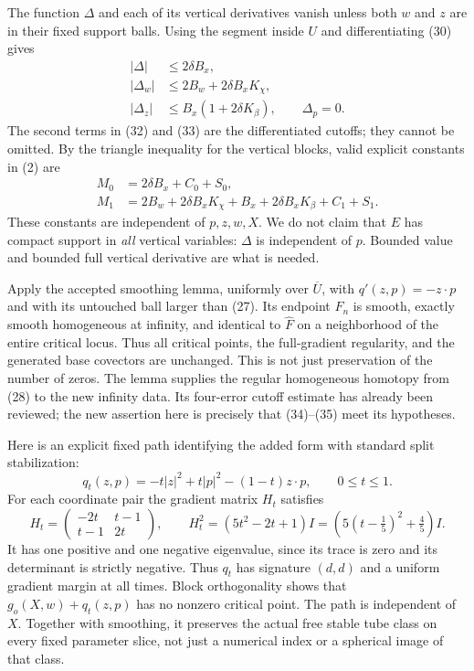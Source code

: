 \documentclass[11pt]{article}
\begin{document}
The function \(\Delta\) and each of its vertical derivatives vanish
unless both \(w\) and \(z\) are in their fixed support balls.
Using the segment inside \(U\) and differentiating (30) gives
\begin{align}
 |\Delta|&\leq2\delta B_x, \tag{31}\\
 |\Delta_w|&\leq2B_w+2\delta B_xK_\chi, \tag{32}\\
 |\Delta_z|&\leq B_x(1+2\delta K_\beta),\qquad
 \Delta_p=0. \tag{33}
\end{align}
The second terms in (32) and (33) are the differentiated cutoffs;
they cannot be omitted. By the triangle inequality for the
vertical blocks, valid explicit constants in (2) are
\begin{align}
 M_0&=2\delta B_x+C_0+S_0, \tag{34}\\
 M_1&=2B_w+2\delta B_xK_\chi+
         B_x+2\delta B_xK_\beta+C_1+S_1. \tag{35}
\end{align}
These constants are independent of \(p,z,w,X\).
We do not claim that \(E\) has compact support in \emph{all}
vertical variables: \(\Delta\) is independent of \(p\).
Bounded value and bounded full vertical derivative are what is needed.

Apply the accepted smoothing lemma, uniformly over \(\overline U\),
with \(q'(z,p)=-z\cdot p\) and with its untouched ball larger
than (27). Its endpoint \(F_n\) is smooth, exactly smooth
homogeneous at infinity, and identical to \(\widehat F\) on a
neighborhood of the entire critical locus. Thus all critical points,
the full-gradient regularity, and the generated base covectors are
unchanged. This is not just preservation of the number of zeros.
The lemma supplies the regular homogeneous homotopy from (28)
to the new infinity data. Its four-error cutoff estimate has already
been reviewed; the new assertion here is precisely that (34)--(35)
meet its hypotheses.

Here is an explicit fixed path identifying the added form with
standard split stabilization:
\[
 q_t(z,p)=-t|z|^2+t|p|^2-(1-t)z\cdot p,\qquad 0\leq t\leq1.
 \tag{36}
\]
For each coordinate pair the gradient matrix \(H_t\) satisfies
\[
 H_t=\begin{pmatrix}-2t&t-1\\t-1&2t\end{pmatrix},\qquad
 H_t^2=(5t^2-2t+1)I
   =\left(5(t-\tfrac15)^2+\tfrac45\right)I.
 \tag{37}
\]
It has one positive and one negative eigenvalue, since its trace
is zero and its determinant is strictly negative. Thus \(q_t\)
has signature \((d,d)\) and a uniform gradient margin at all times.
Block orthogonality shows that \(g_o(X,w)+q_t(z,p)\) has no
nonzero critical point. The path is independent of \(X\).
Together with smoothing, it preserves the actual free stable tube
class on every fixed parameter slice, not just a numerical index
or a spherical image of that class.
\end{document}
